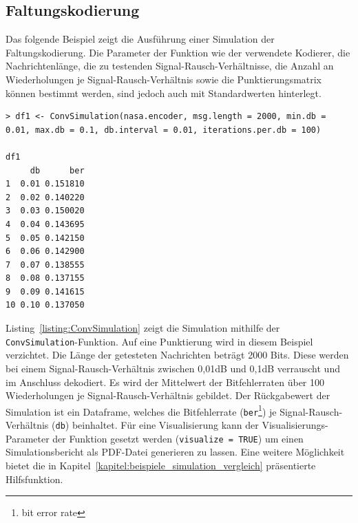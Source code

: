 \subsection{Faltungskodierung}
\label{kapitel:beispiele_simulation_faltungskodierung}
Das folgende Beispiel zeigt die Ausführung einer Simulation der Faltungskodierung. Die Parameter der Funktion wie der verwendete Kodierer, die Nachrichtenlänge, die zu testenden Signal-Rausch-Verhältnisse, die Anzahl an Wiederholungen je Signal-Rausch-Verhältnis sowie die Punktierungsmatrix können bestimmt werden, sind jedoch auch mit Standardwerten hinterlegt.
\begin{lstlisting}[caption=Simulation der Faltungskodierung, label={listing:ConvSimulation}, float=!th]
> df1 <- ConvSimulation(nasa.encoder, msg.length = 2000, min.db = 0.01, max.db = 0.1, db.interval = 0.01, iterations.per.db = 100)

df1
     db      ber
1  0.01 0.151810
2  0.02 0.140220
3  0.03 0.150020
4  0.04 0.143695
5  0.05 0.142150
6  0.06 0.142900
7  0.07 0.138555
8  0.08 0.137155
9  0.09 0.141615
10 0.10 0.137050
\end{lstlisting}
Listing~\ref{listing:ConvSimulation} zeigt die Simulation mithilfe der \texttt{ConvSimulation}-Funktion. Auf eine Punktierung wird in diesem Beispiel verzichtet. Die Länge der getesteten Nachrichten beträgt 2000 Bits. Diese werden bei einem Signal-Rausch-Verhältnis zwischen 0,01dB und 0,1dB verrauscht und im Anschluss dekodiert. Es wird der Mittelwert der Bitfehlerraten über 100 Wiederholungen je Signal-Rausch-Verhältnis gebildet. Der Rückgabewert der Simulation ist ein Dataframe, welches die Bitfehlerrate (\texttt{ber}\footnote{bit error rate}) je Signal-Rausch-Verhältnis (\texttt{db}) beinhaltet. Für eine Visualisierung kann der Visualisierungs-Parameter der Funktion gesetzt werden (\texttt{visualize = TRUE}) um einen Simulationsbericht als PDF-Datei generieren zu lassen. Eine weitere Möglichkeit bietet die in Kapitel~\ref{kapitel:beispiele_simulation_vergleich} präsentierte Hilfsfunktion.

